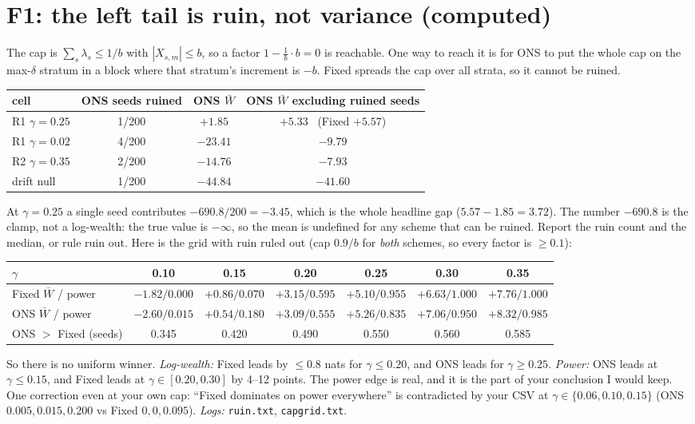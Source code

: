 \documentclass[11pt]{article}
\begin{document}
\section{F1: the left tail is ruin, not variance (computed)}
The cap is $\sum_s\lambda_s\le 1/b$ with $|X_{s,m}|\le b$, so a factor $1-\tfrac1b\cdot b=0$ is reachable. One way to reach it is for ONS to put the whole cap on the max-$\delta$ stratum in a block where that stratum's increment is $-b$. Fixed spreads the cap over all strata, so it cannot be ruined.
\begin{center}\small
\begin{tabular}{lccc}
\toprule
cell & ONS seeds ruined & ONS $\bar W$ & ONS $\bar W$ excluding ruined seeds \\
\midrule
R1 $\gamma=0.25$ & 1/200 & $+1.85$ & $+5.33$ \ (Fixed $+5.57$)\\
R1 $\gamma=0.02$ & 4/200 & $-23.41$ & $-9.79$\\
R2 $\gamma=0.35$ & 2/200 & $-14.76$ & $-7.93$\\
drift null & 1/200 & $-44.84$ & $-41.60$\\
\bottomrule
\end{tabular}
\end{center}
At $\gamma=0.25$ a single seed contributes $-690.8/200=-3.45$, which is the whole headline gap ($5.57-1.85=3.72$).
The number $-690.8$ is the clamp, not a log-wealth: the true value is $-\infty$, so the mean is undefined for any scheme that can be ruined. Report the ruin count and the median, or rule ruin out.
Here is the grid with ruin ruled out (cap $0.9/b$ for \emph{both} schemes, so every factor is $\ge0.1$):
\begin{center}\footnotesize
\begin{tabular}{lcccccc}
\toprule
$\gamma$ & 0.10 & 0.15 & 0.20 & 0.25 & 0.30 & 0.35\\
\midrule
Fixed $\bar W$ / power & $-1.82/0.000$ & $+0.86/0.070$ & $+3.15/0.595$ & $+5.10/0.955$ & $+6.63/1.000$ & $+7.76/1.000$\\
ONS $\bar W$ / power & $-2.60/0.015$ & $+0.54/0.180$ & $+3.09/0.555$ & $\mathbf{+5.26}/0.835$ & $\mathbf{+7.06}/0.950$ & $\mathbf{+8.32}/0.985$\\
ONS $>$ Fixed (seeds) & 0.345 & 0.420 & 0.490 & 0.550 & 0.560 & 0.585\\
\bottomrule
\end{tabular}
\end{center}
So there is no uniform winner. \emph{Log-wealth:} Fixed leads by $\le0.8$ nats for $\gamma\le0.20$, and ONS leads for $\gamma\ge0.25$. \emph{Power:} ONS leads at $\gamma\le0.15$, and Fixed leads at $\gamma\in[0.20,0.30]$ by 4--12 points.
The power edge is real, and it is the part of your conclusion I would keep. One correction even at your own cap: ``Fixed dominates on power everywhere'' is contradicted by your CSV at $\gamma\in\{0.06,0.10,0.15\}$ (ONS $0.005, 0.015, 0.200$ vs Fixed $0, 0, 0.095$).
\emph{Logs:} \texttt{ruin.txt}, \texttt{capgrid.txt}.
\end{document}
